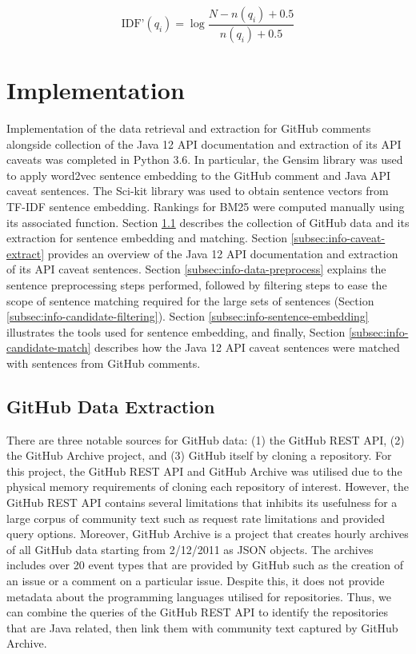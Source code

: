 \begin{equation} \label{eq:bm25-idf} 
\text{IDF'}(q_i) = \log{\frac{N - n(q_i) + 0.5}{n(q_i) + 0.5}}
\end{equation}

\section{Implementation}
\label{sec:info-implement}
Implementation of the data retrieval and extraction for GitHub comments alongside collection of the Java 12 API documentation and extraction of its API caveats was completed in Python 3.6. In particular, the Gensim library was used to apply word2vec sentence embedding to the GitHub comment and Java API caveat sentences. The Sci-kit library was used to obtain sentence vectors from TF-IDF sentence embedding. Rankings for BM25 were computed manually using its associated function. Section \ref{subsec:info-github-extract} describes the collection of GitHub data and its extraction for sentence embedding and matching. Section \ref{subsec:info-caveat-extract} provides an overview of the Java 12 API documentation and extraction of its API caveat sentences. Section \ref{subsec:info-data-preprocess} explains the sentence preprocessing steps performed, followed by filtering steps to ease the scope of sentence matching required for the large sets of sentences (Section \ref{subsec:info-candidate-filtering}). Section \ref{subsec:info-sentence-embedding} illustrates the tools used for sentence embedding, and finally, Section \ref{subsec:info-candidate-match} describes how the Java 12 API caveat sentences were matched with sentences from GitHub comments.

\subsection{GitHub Data Extraction}
\label{subsec:info-github-extract}
There are three notable sources for GitHub data: (1) the GitHub REST API, (2) the GitHub Archive project, and (3) GitHub itself by cloning a repository. For this project, the GitHub REST API and GitHub Archive was utilised due to the physical memory requirements of cloning each repository of interest. However, the GitHub REST API contains several limitations that inhibits its usefulness for a large corpus of community text such as request rate limitations and provided query options. Moreover, GitHub Archive is a project that creates hourly archives of all GitHub data starting from 2/12/2011 as JSON objects. The archives includes over 20 event types that are provided by GitHub such as the creation of an issue or a comment on a particular issue. Despite this, it does not provide metadata about the programming languages utilised for repositories. Thus, we can combine the queries of the GitHub REST API to identify the repositories that are Java related, then link them with community text captured by GitHub Archive.\\ 


